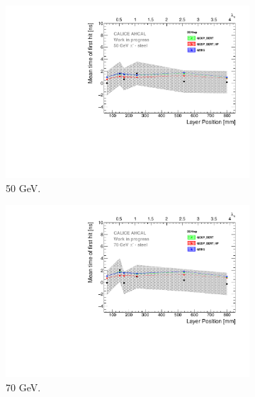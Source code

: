 \begin{figure}[htbp!]
\begin{subfigure}[t]{0.49\textwidth}
    \includegraphics[width=1\textwidth]{../Thesis_Plots/Timing/Pions/Plots/ComparisonToSim/Time_Depth_50GeV_DD4hep.pdf}
    \caption{50 GeV.} \label{fig:Depth_SimData_50GeV_DD4hep}
  \end{subfigure}
  \hfill
  \begin{subfigure}[t]{0.49\textwidth}
    \centering
    \includegraphics[width=1\textwidth]{../Thesis_Plots/Timing/Pions/Plots/ComparisonToSim/Time_Depth_70GeV_DD4hep.pdf}
    \caption{70 GeV.} \label{fig:Depth_SimData_70GeV_DD4hep}
  \end{subfigure}
  \hfill
  \begin{subfigure}[t]{0.49\textwidth}
    \centering

\end{subfigure}
\end{figure}

